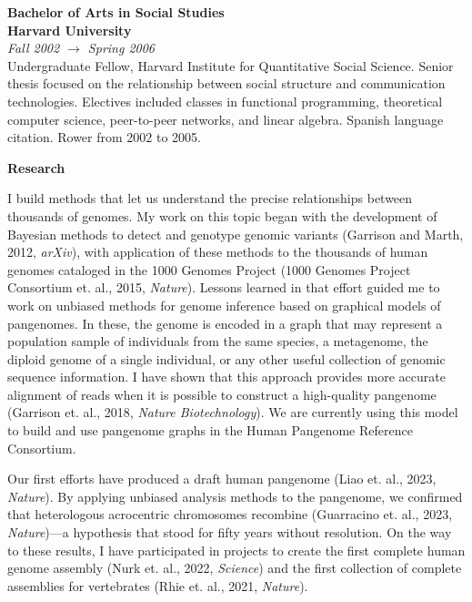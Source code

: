 \documentclass[11pt,hidelinks,letterpaper]{article}
\begin{document}
\hfill \break
\noindent
{\large \bf Bachelor of Arts in Social Studies \\ Harvard University} \\
\emph{Fall 2002 $\to$ Spring 2006} \\
\noindent
Undergraduate Fellow, Harvard Institute for Quantitative Social Science. Senior thesis focused on the relationship between social structure and communication technologies. Electives included classes in functional programming, theoretical computer science, peer-to-peer networks, and linear algebra. Spanish language citation. Rower from 2002 to 2005.

\hfill \break
\hfill \break
\noindent
{\LARGE \bf Research}
\hfill \break

\noindent
I build methods that let us understand the precise relationships between thousands of genomes.
My work on this topic began with the development of Bayesian methods to detect and genotype genomic variants (Garrison and Marth, 2012, \textit{arXiv}), with application of these methods to the thousands of human genomes cataloged in the 1000 Genomes Project (1000 Genomes Project Consortium et. al., 2015, \textit{Nature}).
Lessons learned in that effort guided me to work on unbiased methods for genome inference based on graphical models of pangenomes.
In these, the genome is encoded in a graph that may represent a population sample of individuals from the same species, a metagenome, the diploid genome of a single individual, or any other useful collection of genomic sequence information.
I have shown that this approach provides more accurate alignment of reads when it is possible to construct a high-quality pangenome (Garrison et. al., 2018, \textit{Nature Biotechnology}).
We are currently using this model to build and use pangenome graphs in the Human Pangenome Reference Consortium.

Our first efforts have produced a draft human pangenome (Liao et. al., 2023, \textit{Nature}).
By applying unbiased analysis methods to the pangenome, we confirmed that heterologous acrocentric chromosomes recombine (Guarracino et. al., 2023, \textit{Nature})---a hypothesis that stood for fifty years without resolution.
On the way to these results, I have participated in projects to create the first complete human genome assembly (Nurk et. al., 2022, \textit{Science}) and the first collection of complete assemblies for vertebrates (Rhie et. al., 2021, \textit{Nature}).
\end{document}
